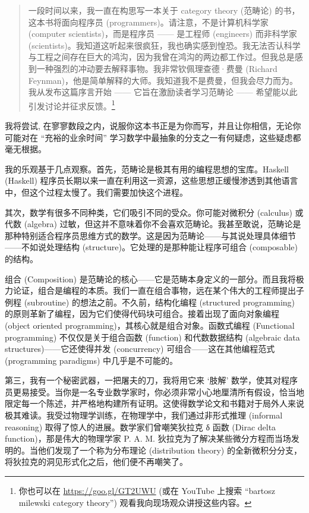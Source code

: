 
\begin{quote}
  一段时间以来，我一直在构思写一本关于 category theory (范畴论) 的书，这本书将面向程序员 (programmers)。请注意，不是计算机科学家 (computer scientists)，而是程序员 —— 是工程师 (engineers) 而非科学家 (scientists)。我知道这听起来很疯狂，我也确实感到惶恐。我无法否认科学与工程之间存在巨大的鸿沟，因为我曾在鸿沟的两边都工作过。但我总是感到一种强烈的冲动要去解释事物。我非常钦佩理查德·费曼 (Richard Feynman)，他是简单解释的大师。我知道我不是费曼，但我会尽力而为。我从发布这篇序言开始 —— 它旨在激励读者学习范畴论 —— 希望能以此引发讨论并征求反馈。\footnote{
    你也可以在 \href{https://goo.gl/GT2UWU}{https://goo.gl/GT2UWU} (或在 YouTube 上搜索 “bartosz milewski category theory”) 观看我向现场观众讲授这些内容。}
\end{quote}

\lettrine[lhang=0.17]{我}{将尝试}, 在寥寥数段之内，说服你这本书正是为你而写，并且让你相信，无论你可能对在 “充裕的业余时间” 学习数学中最抽象的分支之一有何疑虑，这些疑虑都毫无根据。

我的乐观基于几点观察。首先，范畴论是极其有用的编程思想的宝库。Haskell (Haskell) 程序员长期以来一直在利用这一资源，这些思想正缓慢渗透到其他语言中，但这个过程太慢了。我们需要加快这个进程。

其次，数学有很多不同种类，它们吸引不同的受众。你可能对微积分 (calculus) 或代数 (algebra) 过敏，但这并不意味着你不会喜欢范畴论。我甚至敢说，范畴论是那种特别适合程序员思维方式的数学。这是因为范畴论——与其说处理具体细节——不如说处理结构 (structure)。它处理的是那种能让程序可组合 (composable) 的结构。

组合 (Composition) 是范畴论的核心——它是范畴本身定义的一部分。而且我将极力论证，组合是编程的本质。我们一直在组合事物，远在某个伟大的工程师提出子例程 (subroutine) 的想法之前。不久前，结构化编程 (structured programming) 的原则革新了编程，因为它们使得代码块可组合。接着出现了面向对象编程 (object oriented programming)，其核心就是组合对象。函数式编程 (Functional programming) 不仅仅是关于组合函数 (function) 和代数数据结构 (algebraic data structures)——它还使得并发 (concurrency) 可组合——这在其他编程范式 (programming paradigms) 中几乎是不可能的。

第三，我有一个秘密武器，一把屠夫的刀，我将用它来 ‘肢解’ 数学，使其对程序员更易接受。当你是一名专业数学家时，你必须非常小心地厘清所有假设，恰当地限定每一个陈述，并严格地构建所有证明。这使得数学论文和书籍对于局外人来说极其难读。我受过物理学训练，在物理学中，我们通过非形式推理 (informal reasoning) 取得了惊人的进展。数学家们曾嘲笑狄拉克 δ 函数 (Dirac delta function)，那是伟大的物理学家 P. A. M. 狄拉克为了解决某些微分方程而当场发明的。当他们发现了一个称为分布理论 (distribution theory) 的全新微积分分支，将狄拉克的洞见形式化之后，他们便不再嘲笑了。

